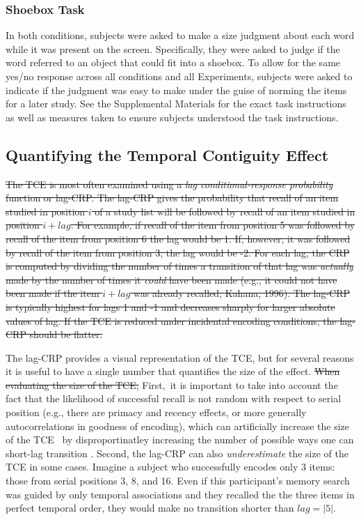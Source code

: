 \documentclass[man,natbib,floatsintext]{apa6} %
\begin{document}
\subsubsection{Shoebox Task} In both conditions, subjects were asked to make a size judgment about each word while it was present on the screen. Specifically, they were asked  to judge if the word referred to an object that could fit into a shoebox. To allow for the same yes/no response across all conditions and all Experiments, subjects were asked to indicate if the judgment was easy to make under the guise of norming the items for a later study. See the Supplemental Materials for the exact task instructions as well as measures taken to ensure subjects understood the task instructions.

\subsection{Quantifying the Temporal Contiguity Effect} \st{The TCE is most often examined using a \textit{lag conditional-response probability} function or lag-CRP. The lag-CRP gives the probability that recall of an item studied in position $i$ of a study list will be followed by recall of an item studied in position $i+lag$. For example, if recall of the item from position 5 was followed by recall of the item from position 6 the lag would be 1. If, however, it was followed by recall of the item from position 3, the lag would be -2. For each lag, the CRP is computed by dividing the number of times a transition of that lag was \emph{actually} made by the number of times it \emph{could} have been made (e.g., it could not have been made if the item $i+lag$ was already recalled; Kahana, 1996). The lag-CRP is typically highest for lags 1 and -1 and decreases sharply for larger absolute values of lag. If the TCE is reduced under incidental encoding conditions, the lag-CRP should be flatter.}

The lag-CRP provides a visual representation of the TCE, but for several reasons it is useful to have a single number that quantifies the size of the effect. \st{When evaluating the size of the TCE,} \color{red}First,\color{black}~it is important to take into account the fact that the likelihood of successful recall is not random with respect to serial position (e.g., there are primacy and recency effects, or more generally autocorrelations in goodness of encoding), which can artificially increase the size of the TCE \color{red}~by disproportinatley increasing the number of possible ways one can short-lag transition \citep{HealKaha17,Hint16}. Second, the lag-CRP can also \emph{underestimate} the size of the TCE in some cases. Imagine a subject who successfully encodes only 3 items: those from serial positions 3, 8, and 16. Even if this participant's memory search was guided by only temporal associations and they recalled the the three items in perfect temporal order, they would make no transition shorter than $lag=|5|$. 
\end{document}
